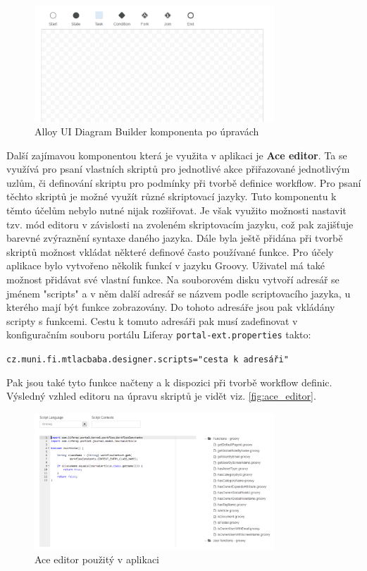 \documentclass{fithesis}
\begin{document}
\begin{figure}[htp]
\centering
\includegraphics[width=340px]{images/diagram_builder_uprav.png}
\caption{Alloy UI Diagram Builder komponenta po úpravách}
\label{fig:diagram_builder_uprav}
\end{figure}

Další zajímavou komponentou která je využita v aplikaci je \textbf{Ace editor}. Ta se využívá pro psaní vlastních skriptů pro jednotlivé akce přiřazované jednotlivým uzlům, či definování skriptu pro podmínky při tvorbě definice workflow. Pro psaní těchto skriptů je možné využít různé skriptovací jazyky. Tuto komponentu k těmto účelům nebylo nutné nijak rozšiřovat. Je však využito možnosti nastavit tzv. mód editoru v závislosti na zvoleném skriptovacím jazyku, což pak zajišťuje barevné zvýraznění syntaxe daného jazyka. Dále byla ještě přidána při tvorbě skriptů možnost vkládat některé definové často používané funkce. Pro účely aplikace bylo vytvořeno několik funkcí v jazyku Groovy. Uživatel má také možnost přidávat své vlastní funkce. Na souborovém disku vytvoří adresář se jménem "scripts" a v něm další adresář se názvem podle scriptovacího jazyka, u kterého mají být funkce zobrazovány. Do tohoto adresáře jsou pak vkládány scripty s funkcemi. Cestu k tomuto adresáři pak musí zadefinovat v konfiguračním souboru portálu Liferay \verb|portal-ext.properties| takto: 

\verb|cz.muni.fi.mtlacbaba.designer.scripts="cesta k adresáři" |

Pak jsou také tyto funkce načteny a k dispozici při tvorbě workflow definic. Výsledný vzhled editoru na úpravu skriptů je vidět viz. \autoref{fig:ace_editor}.
 
\begin{figure}[htp]
\centering
\includegraphics[width=340px]{images/ace_editor.png}
\caption{Ace editor použitý v aplikaci}
\label{fig:ace_editor}
\end{figure}
\end{document}

